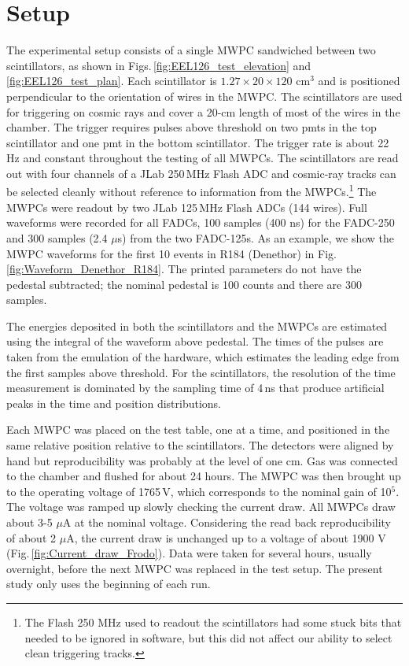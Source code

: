\documentclass[12pt]{article}
\begin{document}
\section{Setup}
The experimental setup consists of a single MWPC sandwiched between two scintillators, as shown in Figs.\,\ref{fig:EEL126_test_elevation} and \ref{fig:EEL126_test_plan}.
Each scintillator is $1.27\times20\times120$ cm$^3$ and is positioned perpendicular to the orientation of wires in the MWPC. The scintillators are used for triggering
on cosmic rays and cover a 20-cm length of most of the wires in the chamber. The trigger requires pulses above threshold on two pmts in the top scintillator and one pmt in the bottom scintillator. The trigger rate is about 22\,Hz and constant throughout the testing of all MWPCs. The scintillators are read out with four channels of a JLab 250\,MHz Flash ADC and cosmic-ray tracks can be selected cleanly without reference to information from the MWPCs.\footnote{The Flash 250 MHz used to readout the scintillators had some stuck bits that needed to be ignored in software, but this did not affect our ability to select clean triggering tracks.} The MWPCs were readout by two JLab 125\,MHz Flash ADCs (144 wires). Full waveforms were recorded for all FADCs, 100 samples (400 ns) for the FADC-250 and 300 samples (2.4 $\mu$s) from the two FADC-125s. As an example, we show the MWPC waveforms for the first 10 events in R184 (Denethor) in Fig.\,\ref{fig:Waveform_Denethor_R184}. The printed parameters do not have the pedestal subtracted; the nominal pedestal is 100 counts and there are 300 samples.

The energies deposited in both the scintillators and the MWPCs are estimated using the integral of the waveform above pedestal. The times of the pulses are taken from the emulation of the hardware, which estimates the leading edge from the first samples above threshold. For the scintillators, the resolution of the time measurement is dominated by the sampling time of 4\,ns that produce artificial peaks in the time and position distributions. 

Each MWPC was placed on the test table, one at a time, and positioned in the same relative position relative to the scintillators. The detectors were aligned by hand but reproducibility was probably at the level of one cm. Gas was connected to the chamber and flushed for about 24 hours. The MWPC was then brought up to the operating  voltage of 1765\,V, which corresponds to the nominal gain of 10$^5$.  The voltage was ramped up slowly checking the current draw. All MWPCs draw about 3-5 $\mu$A at the nominal voltage. Considering the read back reproducibility of about 2 $\mu$A, the current draw is unchanged up to a voltage of about 1900 V 
(Fig.\,\ref{fig:Current_draw_Frodo}). Data were taken for several hours, usually overnight, before the next MWPC was replaced in the test setup. The present study only uses the beginning of each run.
\end{document}
